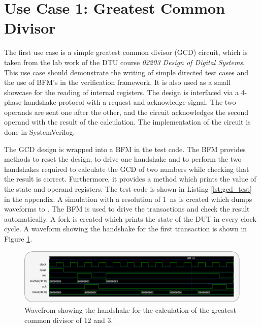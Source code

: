 
\section{Use Case 1: Greatest Common Divisor} %

The first use case is a simple greatest common divisor (GCD) circuit, which is taken from the lab work of the DTU
course \textit{02203 Design of Digital Systems}. This use case should demonstrate the writing of simple directed test
cases and the use of BFM's in the verification framework. It is also used as a small showcase for the reading of
internal registers. The design is interfaced via a 4-phase handshake protocol with a request and acknowledge signal.
The two operands are sent one after the other, and the circuit acknowledges the second operand with the result of the
calculation. The implementation of the circuit is done in SystemVerilog.

The GCD design is wrapped into a BFM in the test code. The BFM provides methods to reset the design, to drive one
handshake and to perform the two handshakes required to calculate the GCD of two numbers while checking that the
result is correct. Furthermore, it provides a method which prints the value of the state and operand registers. The
test code is shown in Listing \ref{lst:gcd_test} in the appendix. A simulation with a resolution of \SI{1}{ns} is
created which dumps waveforms to . The BFM is used to drive the transactions and check the result
automatically. A fork is created which prints the state of the DUT in every clock cycle. A waveform showing the
handshake for the first transaction is shown in Figure \ref{fig:gcd_timing}.

\begin{figure}[t]
  \centering
  \includegraphics[width=\textwidth]{diagrams/gcd_timing.pdf}
  \caption{Wavefrom showing the handshake for the calculation of the greatest common divisor of 12 and 3.}
  \label{fig:gcd_timing}
\end{figure}

